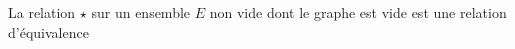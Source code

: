 La relation $\star$ sur un ensemble $E$ non vide dont le graphe est vide est une relation d'équivalence

\begin{reponses}
\end{reponses}

